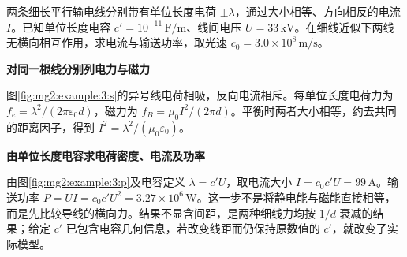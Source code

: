 \begin{question}\begin{example}[输电线电荷力与磁力的平衡]\label{mg2:example:3}
两条细长平行输电线分别带有单位长度电荷 $\pm\lambda$，通过大小相等、方向相反的电流 $I$。已知单位长度电容 $c'=10^{-11}\,\mathrm{F/m}$、线间电压 $U=33\,\mathrm{kV}$。在细线近似下两线无横向相互作用，求电流与输送功率，取光速 $c_0=3.0\times10^8\,\mathrm{m/s}$。
\end{example}
\end{question}
\begin{solution}\textbf{对同一根线分别列电力与磁力}\par\nobreak
图\ref{fig:mg2:example:3:s}的异号线电荷相吸，反向电流相斥。每单位长度电荷力为 $f_e=\lambda^2/(2\pi\varepsilon_0d)$，磁力为 $f_B=\mu_0I^2/(2\pi d)$。平衡时两者大小相等，约去共同的距离因子，得到 $I^2=\lambda^2/(\mu_0\varepsilon_0)$。



\par\medskip{}\noindent\textbf{由单位长度电容求电荷密度、电流及功率}\par\nobreak
由图\ref{fig:mg2:example:3:p}及电容定义 $\lambda=c'U$，取电流大小 $I=c_0c'U=99\,\mathrm A$。输送功率 $P=UI=c_0c'U^2=3.27\times10^6\,\mathrm W$。这一步不是将静电能与磁能直接相等，而是先比较导线的横向力。结果不显含间距，是两种细线力均按 $1/d$ 衰减的结果；给定 $c'$ 已包含电容几何信息，若改变线距而仍保持原数值的 $c'$，就改变了实际模型。\end{solution}
